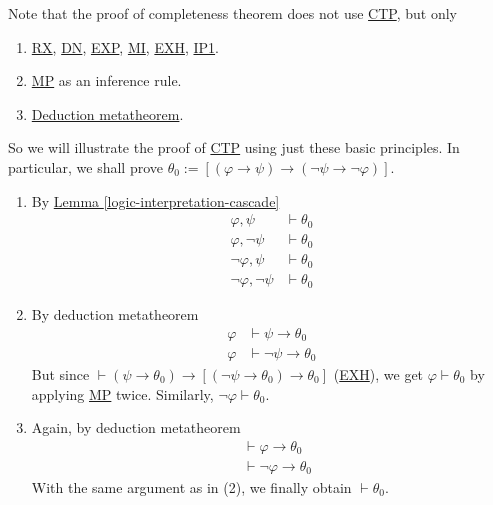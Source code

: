 \documentclass{treatise}
\begin{document}
\begin{example}
Note that the proof of completeness theorem does not use \hyperref[HPL-T-CTP]{CTP}, but only
\begin{enumerate}
    \item \hyperref[HPL-T-RX]{RX}, \hyperref[HPL-T-DN]{DN}, \hyperref[HPL-T-EXP]{EXP}, \hyperref[HPL-T-MI]{MI}, \hyperref[HPL-T-EXH]{EXH}, \hyperref[HPL-A-IP1]{IP1}.
    \item \hyperref[HPL-R-MP]{MP} as an inference rule.
    \item \hyperref[logic-deduct-metathm]{Deduction metatheorem}.
\end{enumerate}
So we will illustrate the proof of \hyperref[HPL-T-CTP]{CTP} using just these basic principles. In particular, we shall prove $\theta_0 := [(\varphi \to \psi) \to (\neg \psi \to \neg \varphi)]$.
\begin{enumerate}
    \item By \hyperref[logic-interpretation-cascade]{Lemma \ref*{logic-interpretation-cascade}}
    \begin{align*}
        \varphi, \psi & \vdash \theta_0
        \\
        \varphi, \neg \psi & \vdash \theta_0
        \\
        \neg \varphi, \psi & \vdash \theta_0
        \\
        \neg \varphi, \neg \psi & \vdash \theta_0
    \end{align*}
    \item By deduction metatheorem
    \begin{align*}
        \varphi & \vdash \psi \to \theta_0
        \\
        \varphi & \vdash \neg \psi \to \theta_0
    \end{align*}
    But since $\vdash (\psi \to \theta_0) \to [(\neg \psi \to \theta_0) \to \theta_0]$ (\hyperref[HPL-T-EXH]{EXH}), we get $\varphi \vdash \theta_0$ by applying \hyperref[HPL-R-MP]{MP} twice. Similarly, $\neg \varphi \vdash \theta_0$.
    \item Again, by deduction metatheorem
    \begin{align*}
        & \vdash \varphi \to \theta_0
        \\
        & \vdash \neg \varphi \to \theta_0
    \end{align*}
    With the same argument as in (2), we finally obtain $\vdash \theta_0$.
\end{enumerate}
\end{example}
\end{document}
